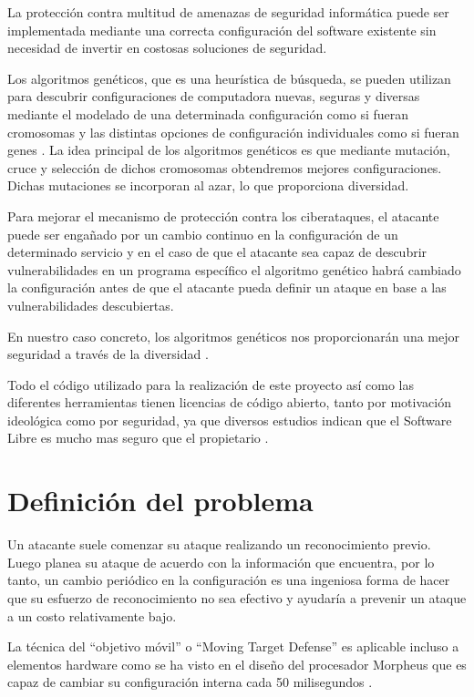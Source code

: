 \bigskip
La protección contra multitud de amenazas de seguridad informática puede ser implementada mediante una correcta configuración del software existente sin necesidad de invertir en costosas soluciones de seguridad.

\bigskip
Los algoritmos genéticos, que es una heurística de búsqueda, se pueden utilizan para descubrir configuraciones de computadora nuevas, seguras y diversas mediante el modelado de una determinada configuración como si fueran cromosomas y las distintas opciones de configuración individuales como si fueran genes \cite{gensch_evolving_2016}. La idea principal de los algoritmos genéticos es que mediante mutación, cruce y selección de dichos cromosomas obtendremos mejores configuraciones. Dichas mutaciones se incorporan al azar, lo que proporciona diversidad.

\bigskip
Para mejorar el mecanismo de protección contra los ciberataques, el atacante puede ser engañado por un cambio continuo en la configuración de un determinado servicio y en el caso de que el atacante sea capaz de descubrir vulnerabilidades en un programa específico el algoritmo genético habrá cambiado la configuración antes de que el atacante pueda definir un ataque en base a las vulnerabilidades descubiertas.

\bigskip
En nuestro caso concreto, los algoritmos genéticos nos proporcionarán una mejor seguridad a través de la diversidad \cite{crouse_improving_2012}.

\bigskip
Todo el código utilizado para la realización de este proyecto así como las diferentes herramientas tienen licencias de código abierto, tanto por motivación ideológica como por seguridad, ya que diversos estudios indican que el Software Libre es mucho mas seguro que el propietario \cite{clark_is_2009}.


\section{Definición del problema}

Un atacante suele comenzar su ataque realizando un reconocimiento previo. Luego planea su ataque de acuerdo con la información que encuentra, por lo tanto, un cambio periódico en la configuración es una ingeniosa forma de hacer que su esfuerzo de reconocimiento no sea efectivo y ayudaría a prevenir un ataque a un costo relativamente bajo.

\bigskip
La técnica del ``objetivo móvil'' o ``Moving Target Defense'' es aplicable incluso a elementos hardware como se ha visto en el diseño del procesador Morpheus que es capaz de cambiar su configuración interna cada 50 milisegundos \cite{gallagher_morpheus:_2019}.

